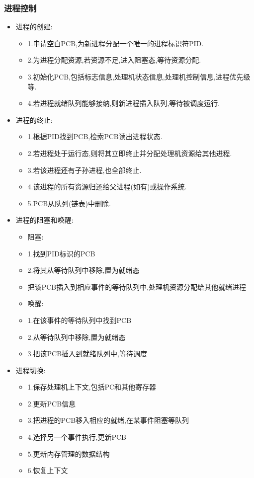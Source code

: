 \documentclass{ctexart}
\begin{document}
\subsubsection{进程控制}
\begin{itemize}
	\item 进程的创建:
	\begin{itemize}
		\item 1.申请空白PCB,为新进程分配一个唯一的进程标识符PID.
		\item 2.为进程分配资源,若资源不足,进入阻塞态,等待资源分配.
		\item 3.初始化PCB,包括标志信息,处理机状态信息,处理机控制信息,进程优先级等.
		\item 4.若进程就绪队列能够接纳,则新进程插入队列,等待被调度运行.
	\end{itemize}
	\item 进程的终止:
	\begin{itemize}
		\item 1.根据PID找到PCB,检索PCB读出进程状态.
		\item 2.若进程处于运行态,则将其立即终止并分配处理机资源给其他进程.
		\item 3.若该进程还有子孙进程,也全部终止.
		\item 4.该进程的所有资源归还给父进程(如有)或操作系统.
		\item 5.PCB从队列(链表)中删除.
	\end{itemize}
	\item 进程的阻塞和唤醒:\\
	\begin{itemize}
		\item 阻塞:
		\item 1.找到PID标识的PCB
		\item 2.将其从等待队列中移除,置为就绪态
		\item 把该PCB插入到相应事件的等待队列中,处理机资源分配给其他就绪进程
		\item 唤醒:
		\item 1.在该事件的等待队列中找到PCB
		\item 2.从等待队列中移除,置为就绪态
		\item 3.把该PCB插入到就绪队列中,等待调度
	\end{itemize}
	\item 进程切换:\\
	\begin{itemize}
		\item 1.保存处理机上下文,包括PC和其他寄存器
		\item 2.更新PCB信息
		\item 3.把进程的PCB移入相应的就绪,在某事件阻塞等队列
		\item 4.选择另一个事件执行,更新PCB
		\item 5.更新内存管理的数据结构
		\item 6.恢复上下文
	\end{itemize}
\end{itemize}
\end{document}
